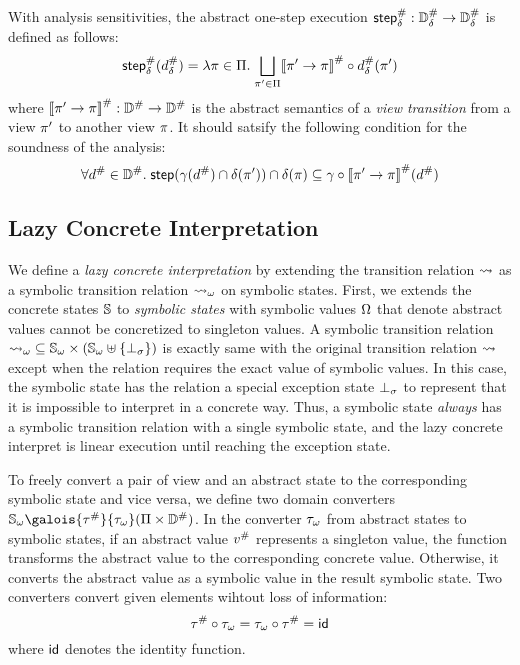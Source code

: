With analysis sensitivities, the abstract one-step execution ${\textsf{step}}^{\#}_\delta:
{\mathbb{D}}^{\#}_\delta \rightarrow {\mathbb{D}}^{\#}_\delta$ is defined as follows:
\[
  {\textsf{step}}^{\#}_\delta({d}^{\#}_\delta) = \lambda \pi \in \Pi. \; \underset{\pi' \in
  \Pi}{\bigsqcup}{{[\![{\pi' \rightarrow \pi}]\!]}^{\#} \circ {d}^{\#}_\delta(\pi')}
\]
where ${[\![{\pi' \rightarrow \pi}]\!]}^{\#}: {\mathbb{D}}^{\#} \rightarrow {\mathbb{D}}^{\#}$ is the abstract
semantics of a \textit{view transition} from a view $\pi'$ to another view
$\pi$.  It should satsify the following condition for the soundness of the
analysis:
\[
  \forall {d}^{\#} \in {\mathbb{D}}^{\#}. \; \textsf{step}(\gamma({d}^{\#}) \cap \delta(\pi'))
  \cap \delta(\pi) \subseteq \gamma \circ
  {[\![{\pi' \rightarrow \pi}]\!]}^{\#}({d}^{\#})
\]


\subsection{Lazy Concrete Interpretation}

We define a \textit{lazy concrete interpretation} by extending the transition
relation $\leadsto$ as a symbolic transition relation ${\leadsto}_\omega$ on symbolic
states. First, we extends the concrete states $\mathbb{S}$ to \textit{symbolic
states} with symbolic values $\Omega$ that denote abstract values cannot be
concretized to singleton values. A symbolic transition relation ${\leadsto}_\omega
\subseteq {\mathbb{S}}_\omega \times ({\mathbb{S}}_\omega \uplus \{ \bot_\sigma \})$ is exactly same
with the original transition relation $\leadsto$ except when the relation requires
the exact value of symbolic values.  In this case, the symbolic state has the
relation a special exception state $\bot_\sigma$ to represent that it is impossible
to interpret in a concrete way.  Thus, a symbolic state \textit{always} has a
symbolic transition relation with a single symbolic state, and the lazy concrete
interpret is linear execution until reaching the exception state.

To freely convert a pair of view and an abstract state to the corresponding
symbolic state and vice versa, we define two domain converters $\symbstset
\galois{\saconverter}{\asconverter} (\viewset \times \absdom)$.  In the
converter ${\tau}_\omega$ from abstract states to symbolic states, if an abstract
value ${v}^{\#}$ represents a singleton value, the function transforms the
abstract value to the corresponding concrete value.  Otherwise, it converts the
abstract value as a symbolic value in the result symbolic state.  Two converters
convert given elements wihtout loss of information:
\[
  {\tau}^{\#} \circ {\tau}_\omega = {\tau}_\omega \circ {\tau}^{\#} = \textsf{id}
\]
where $\textsf{id}$ denotes the identity function.


